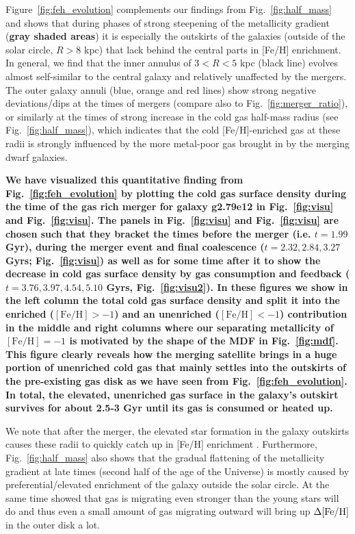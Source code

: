 \documentclass[useAMS,usenatbib]{mnras}
\begin{document}
Figure~\ref{fig:feh_evolution} complements our findings from Fig.~\ref{fig:half_mass} and shows that during phases of strong steepening of the metallicity gradient (\textbf{gray shaded areas}) it is especially the outskirts of the galaxies (outside of the solar circle, $R>8$ kpc) that lack behind the central parts in [Fe/H] enrichment. In general, we find that the inner annulus of $3<R<5$ kpc (black line) evolves almost self-similar to the central galaxy and relatively unaffected by the mergers. The outer galaxy annuli (blue, orange and red lines) show strong negative deviations/dips at the times of mergers (compare also to Fig.~\ref{fig:merger_ratio}), or similarly at the times of strong increase in the cold gas half-mass radius (see Fig.~\ref{fig:half_mass}), which indicates that the cold [Fe/H]-enriched gas at these radii is strongly influenced by the more metal-poor gas brought in by the merging dwarf galaxies. 

\textbf{We have visualized this quantitative finding from Fig.~\ref{fig:feh_evolution} by plotting the cold gas surface density during the time of the gas rich merger for galaxy g2.79e12 in Fig.~\ref{fig:visu} and Fig.~\ref{fig:visu}. The panels in Fig.~\ref{fig:visu} and Fig.~\ref{fig:visu} are chosen such that they bracket the times before the merger (i.e. $t=1.99$ Gyr), during the merger event and final coalescence ($t=2.32, 2.84, 3.27$ Gyrs; Fig.~\ref{fig:visu}) as well as for some time after it to show the decrease in cold gas surface density by gas consumption and feedback ($t=3.76, 3.97, 4.54, 5.10$ Gyrs, Fig.~\ref{fig:visu2}). In these figures we show in the left column the total cold gas surface density and split it into the enriched ($\mathrm{[Fe/H]}>-1$) and an unenriched ($\mathrm{[Fe/H]}<-1$) contribution in the middle and right columns where our separating metallicity of $\mathrm{[Fe/H]}=-1$ is motivated by the shape of the MDF in Fig.~\ref{fig:mdf}. This figure clearly reveals how the merging satellite brings in a huge portion of unenriched cold gas that mainly settles into the outskirts of the pre-existing gas disk as we have seen from Fig.~\ref{fig:feh_evolution}. In total, the elevated, unenriched gas surface in the galaxy's outskirt survives for about 2.5-3 Gyr until its gas is consumed or heated up.}

We note that after the merger, the elevated star formation in the galaxy outskirts causes these radii to quickly catch up in [Fe/H] enrichment \citep[see also Fig. 7 in][]{Buck2020}. Furthermore, Fig.~\ref{fig:half_mass} also shows that the gradual flattening of the metallicity gradient at late times (second half of the age of the Universe) is mostly caused by preferential/elevated enrichment of the galaxy outside the solar circle. At the same time \cite{Minchev2012a} showed that gas is migrating even stronger than the young stars will do and thus even a small amount of gas migrating outward will bring up $\Delta\rm{[Fe/H]}$ in the outer disk a lot.
\end{document}
